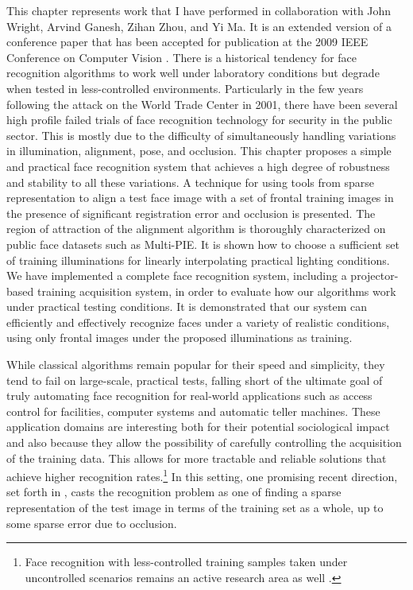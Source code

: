 This chapter represents work that I have performed in collaboration with John Wright,  Arvind Ganesh, Zihan Zhou, and Yi Ma.  It is an extended version of a conference paper that has been accepted for publication at the 2009 IEEE Conference on Computer Vision \cite{Wagner2009-CVPR}.  
There is a historical tendency for face recognition algorithms to work well under laboratory conditions but degrade when tested in less-controlled environments.  
Particularly in the few years following the attack on the World Trade Center in 2001, there have been several high profile failed trials of face recognition technology for security in the public sector.
This is mostly due to the difficulty of simultaneously handling variations in illumination, alignment, pose, and occlusion.
This chapter proposes a simple and practical  face recognition system that achieves a high degree of  
robustness and stability to all these variations. A technique for using tools from sparse representation 
to align a test face image with a set of frontal training 
images in the presence of significant registration error and occlusion is presented. The region 
of attraction of the alignment algorithm is thoroughly characterized on public face datasets such as Multi-PIE.
It is shown how to choose a sufficient set of training illuminations for linearly  
interpolating practical lighting conditions.  We have implemented a complete face recognition
system, including a projector-based training acquisition system, in order to evaluate how our algorithms work under practical testing conditions.  It is demonstrated  
that our system can efficiently and effectively recognize faces under  
a variety of realistic conditions, using only 
frontal images under the proposed illuminations as training.\vspace{0mm}

While classical algorithms \cite{Turk1991-CVPR,Belhumeur1997-PAMI} remain popular for their speed and simplicity, they tend to fail on large-scale, practical tests, falling short of the ultimate goal of truly automating face recognition for real-world applications such as access control for facilities, computer systems and automatic teller machines.  These application domains are interesting both for their potential sociological impact and also because they allow the possibility of carefully controlling the acquisition of the training data.  This allows for more tractable and reliable solutions that achieve higher recognition rates.\footnote{Face recognition with less-controlled training samples taken under uncontrolled scenarios remains an active research area as well \cite{LFW}.} In this setting, one promising recent direction, set forth in \cite{Wright2009-PAMI}, casts the recognition problem as one of finding a sparse representation of the test image in terms of the training set as a whole, up to some sparse error due to occlusion. 

